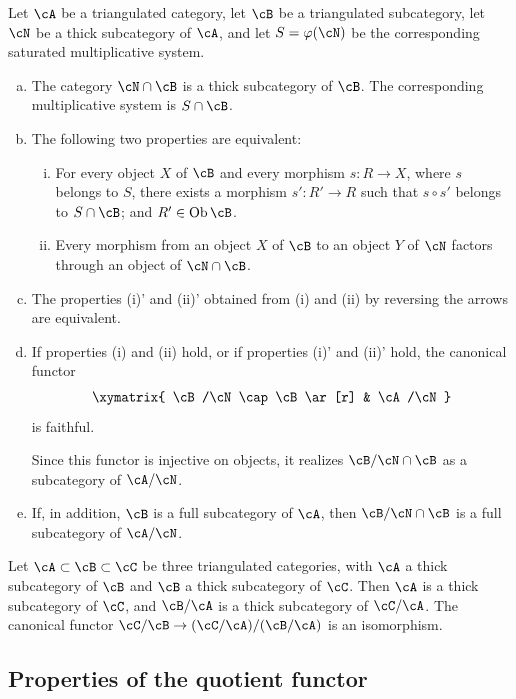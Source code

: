 \begin{theorem}\label{VIII:2-4-2}
Let $\cA$ be a triangulated category, let $\cB$ be a triangulated
subcategory, let $\cN$ be a thick subcategory of $\cA$, and let
$S=\varphi(\cN)$ be the corresponding saturated multiplicative system.
\begin{enumerate}[(a)]
  \item The category $\cN\cap\cB$ is a thick subcategory of $\cB$. The
    corresponding multiplicative system is $S\cap \cB$.
  \item The following two properties are equivalent:
    \begin{enumerate}[(i)]
      \item For every object $X$ of $\cB$ and every morphism $s:R\to X$,
        where $s$ belongs to $S$, there exists a morphism $s':R'\to R$ such
        that $s\circ s'$ belongs to $S\cap \cB$; and
        $R'\in\operatorname{Ob}\cB$.
      \item Every morphism from an object $X$ of $\cB$ to an object $Y$ of
        $\cN$ factors through an object of $\cN\cap \cB$.
    \end{enumerate}
  \item The properties (i)' and (ii)' obtained from (i) and (ii) by
    reversing the arrows are equivalent.
  \item If properties (i) and (ii) hold, or if properties (i)' and (ii)'
    hold, the canonical functor
    \[\xymatrix{
      \cB/\cN\cap \cB \ar[r] & \cA/\cN
    }\]
    is faithful.

    Since this functor is injective on objects, it realizes
    $\cB/\cN\cap\cB$ as a subcategory of $\cA/\cN$.
  \item If, in addition, $\cB$ is a full subcategory of $\cA$, then
    $\cB/\cN\cap \cB$ is a full subcategory of $\cA/\cN$.
\end{enumerate}
\end{theorem}

\begin{corollary}\label{VIII:2-4-3}
Let $\cA\subset \cB\subset \cC$ be three triangulated categories, with
$\cA$ a thick subcategory of $\cB$ and $\cB$ a thick subcategory of
$\cC$. Then $\cA$ is a thick subcategory of $\cC$, and $\cB/\cA$ is a
thick subcategory of $\cC/\cA$. The canonical functor
$\cC/\cB \to (\cC/\cA)/(\cB/\cA)$ is an isomorphism.
\end{corollary}

\subsection{Properties of the quotient functor}\label{VIII:2-5}

